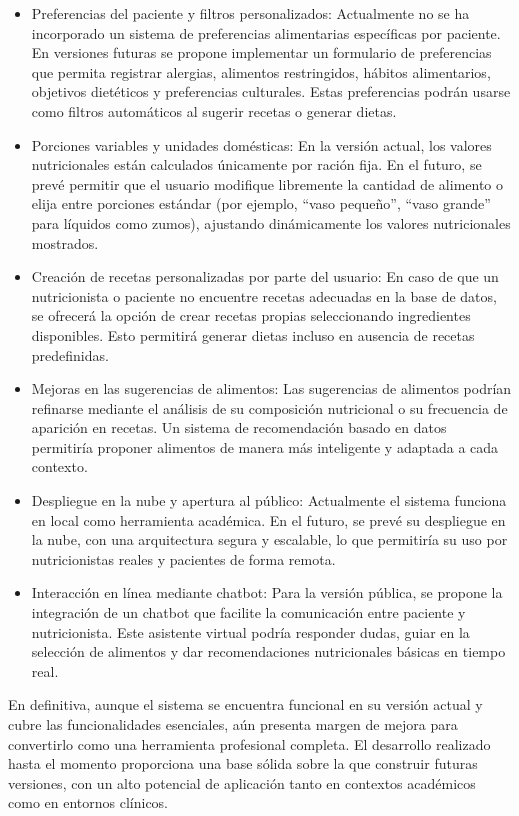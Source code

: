 \begin{itemize}
    \item Preferencias del paciente y filtros personalizados: 
    Actualmente no se ha incorporado un sistema de preferencias alimentarias específicas por paciente. En versiones futuras se propone implementar un formulario de preferencias que permita registrar alergias, alimentos restringidos, hábitos alimentarios, objetivos dietéticos y preferencias culturales. Estas preferencias podrán usarse como filtros automáticos al sugerir recetas o generar dietas.

    \item Porciones variables y unidades domésticas: 
    En la versión actual, los valores nutricionales están calculados únicamente por ración fija. En el futuro, se prevé permitir que el usuario modifique libremente la cantidad de alimento o elija entre porciones estándar (por ejemplo, “vaso pequeño”, “vaso grande” para líquidos como zumos), ajustando dinámicamente los valores nutricionales mostrados.

    \item Creación de recetas personalizadas por parte del usuario:
    En caso de que un nutricionista o paciente no encuentre recetas adecuadas en la base de datos, se ofrecerá la opción de crear recetas propias seleccionando ingredientes disponibles. Esto permitirá generar dietas incluso en ausencia de recetas predefinidas.

    \item Mejoras en las sugerencias de alimentos: 
    Las sugerencias de alimentos podrían refinarse mediante el análisis de su composición nutricional o su frecuencia de aparición en recetas. Un sistema de recomendación basado en datos permitiría proponer alimentos de manera más inteligente y adaptada a cada contexto.

    \item Despliegue en la nube y apertura al público: 
    Actualmente el sistema funciona en local como herramienta académica. En el futuro, se prevé su despliegue en la nube, con una arquitectura segura y escalable, lo que permitiría su uso por nutricionistas reales y pacientes de forma remota.

    \item Interacción en línea mediante chatbot: 
    Para la versión pública, se propone la integración de un chatbot que facilite la comunicación entre paciente y nutricionista. Este asistente virtual podría responder dudas, guiar en la selección de alimentos y dar recomendaciones nutricionales básicas en tiempo real.

\end{itemize}

En definitiva, aunque el sistema se encuentra funcional en su versión actual y cubre las funcionalidades esenciales, aún presenta margen de mejora para convertirlo como una herramienta profesional completa. El desarrollo realizado hasta el momento proporciona una base sólida sobre la que construir futuras versiones, con un alto potencial de aplicación tanto en contextos académicos como en entornos clínicos.

